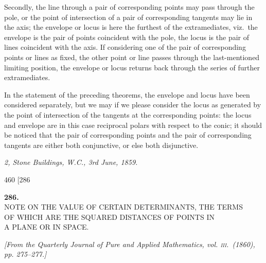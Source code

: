 \documentclass[11pt]{article}
\begin{document}
\smallskip

Secondly, the line through a pair of corresponding points may pass through the
pole, or the point of intersection of a pair of corresponding tangents may lie in the
axis; the envelope or locus is here the furthest of the extramediates, viz.\ the envelope
is the pair of points coincident with the pole, the locus is the pair of lines coincident
with the axis. If considering one of the pair of corresponding points or lines as fixed,
the other point or line passes through the last-mentioned limiting position, the envelope
or locus returns back through the series of further extramediates.

\smallskip

In the statement of the preceding theorems, the envelope and locus have been
considered separately, but we may if we please consider the locus as generated by the
point of intersection of the tangents at the corresponding points: the locus and envelope
are in this case reciprocal polars with respect to the conic; it should be noticed that
the pair of corresponding points and the pair of corresponding tangents are either both
conjunctive, or else both disjunctive.

\smallskip

\hfill\textit{2, Stone Buildings, W.C., 3rd June, 1859.}

\vfill

\newpage
\begin{center}
460 \hfill \textsc{[286}
\end{center}

\bigskip

\begin{center}
\textbf{\large 286.}\\[1ex]
\textsc{NOTE ON THE VALUE OF CERTAIN DETERMINANTS, THE TERMS\\
OF WHICH ARE THE SQUARED DISTANCES OF POINTS IN\\
A PLANE OR IN SPACE.}
\end{center}

\begin{center}
\textit{[From the Quarterly Journal of Pure and Applied Mathematics, vol. \textsc{iii}.\ (1860),
pp. 275--277.]}
\end{center}

\medskip
\end{document}
